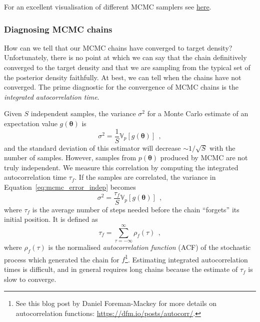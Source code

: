 \documentclass[12pt,dvipsnames]{report}
\renewcommand{\vec}[1]{\boldsymbol{\mathbf{#1}}}
\newcommand{\hquad}{~~}
\begin{document}
For an excellent visualisation of different MCMC samplers see 
\href{http://chi-feng.github.io/mcmc-demo/app.html}{here}.

\subsubsection{Diagnosing MCMC chains}
How can we tell that our MCMC chains have converged to target density?
Unfortunately, there is no point at which we can say that the chain definitively
converged to the target density and that we are sampling from the typical set of 
the posterior density faithfully. At best, we can
tell when the chains have not converged. The prime diagnostic for the convergence
of MCMC chains is the \emph{integrated autocorrelation time}.

Given $S$ independent samples, the variance $\sigma^2$ for a Monte Carlo 
estimate of an expectation value $g(\vec\theta)$  is 
\begin{equation}
    \sigma^2= \frac{1}{S} \mathbb{V}_{p}\left[g(\vec\theta)\right]
    \hquad,
    \label{eq:mcmc_error_indep}
\end{equation}
and the standard deviation of this estimator will decrease
$\sim 1/\sqrt{S}$ with the number of samples.
However, samples from $p(\vec\theta)$ produced by MCMC are not truly independent.
We measure this correlation by computing the integrated autocorrelation
time $\tau_f$. If the samples are correlated, the variance in 
Equation~\ref{eq:mcmc_error_indep} becomes
\begin{equation}
    \sigma^2= \frac{\tau_f}{S} \mathbb{V}_{p}\left[g(\vec\theta)\right]
    \hquad,
    \label{eq:mcmc_error}
\end{equation}
where $\tau_f$ is the average number of steps needed before the chain ``forgets''
its initial position. It is defined as
\begin{equation}
    \tau_f = \sum_{\tau=-\infty}^\infty\rho_f(\tau)
    \hquad,
\end{equation}
where $\rho_f(\tau)$ is the normalised \emph{autocorrelation function} (ACF) of 
the stochastic process which  generated the chain for
$f$\footnote{See this blog post by Daniel Foreman-Mackey for more details on 
autocorrelation functions: \url{https://dfm.io/posts/autocorr/}.}.
Estimating integrated autocorrelation times is difficult, and in general
requires long chains because the estimate of $\tau_f$ is slow to converge.
\end{document}
